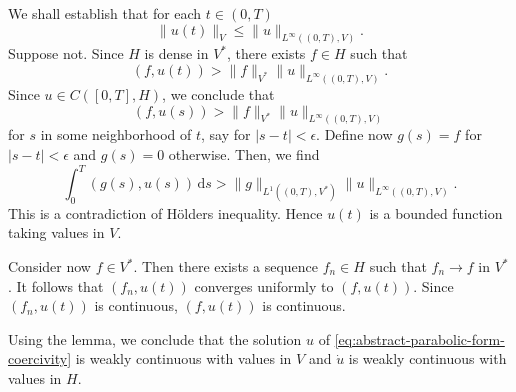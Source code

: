 \begin{Proof}
We shall establish that for each $t\in(0,T)$
\begin{equation}\label{eq:hilbert-triple-weak-continuity-pointwise-bound}
\|u(t)\|_V\leq\|u\|_{L^\infty((0,T),V)}.
\end{equation}
Suppose not. Since $H$ is dense in $V^*$, there exists $f\in H$ such that
\begin{equation}\label{eq:hilbert-triple-weak-continuity-separating-functional}
(f,u(t))>\|f\|_{V^*}\|u\|_{L^\infty((0,T),V)}.
\end{equation}
Since $u\in C([0,T],H)$, we conclude that
\begin{equation}\label{eq:hilbert-triple-weak-continuity-neighborhood-separation}
(f,u(s))>\|f\|_{V^*}\|u\|_{L^\infty((0,T),V)}
\end{equation}
for $s$ in some neighborhood of $t$, say for $|s-t|<\epsilon$. Define now $g(s)=f$ for $|s-t|<\epsilon$ and $g(s)=0$ otherwise. Then, we find
\begin{equation}\label{eq:hilbert-triple-weak-continuity-holder-contradiction}
\int_0^T(g(s),u(s))\,\mathrm{d}s>\|g\|_{L^1((0,T),V^*)}\|u\|_{L^\infty((0,T),V)}.
\end{equation}
This is a contradiction of Hölder\textquotesingle s inequality. Hence $u(t)$ is a bounded function taking values in $V$.\par Consider now $f\in V^*$. Then there exists a sequence $f_n\in H$ such that $f_n\to f$ in $V^*$. It follows that $(f_n,u(t))$ converges uniformly to $(f,u(t))$. Since $(f_n,u(t))$ is continuous, $(f,u(t))$ is continuous.
\end{Proof}

Using the lemma, we conclude that the solution $u$ of \eqref{eq:abstract-parabolic-form-coercivity} is weakly continuous with values in $V$ and $\dot u$ is weakly continuous with values in $H$.

